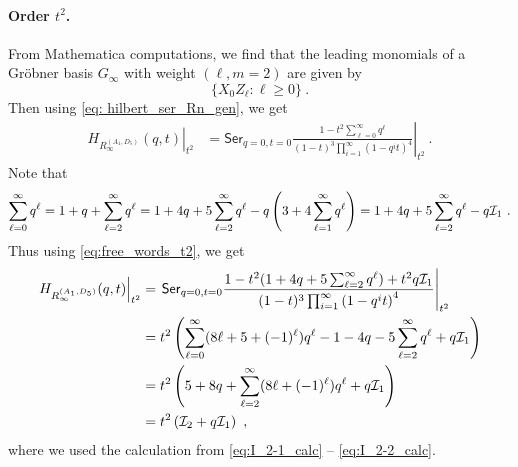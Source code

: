 \documentclass[a4paper,10pt]{article}
\newcommand{\mr}[1]{\mathsf{#1}}
\def\CI {{\cal I}}
\def\CI {{{\cal I}}}
\begin{document}
\paragraph{Order $t^2$.} From Mathematica computations, we find that the leading monomials of a Gr\"{o}bner basis $G_\infty$ with weight  $(\ell,m=2)$ are given by 
\begin{equation}\label{eq:Grob_D5t2}
\{X_0 Z_\ell:\ell\geq 0\}~.    
\end{equation}
Then using \eqref{eq: hilbert_ser_Rn_gen}, we get 
\begin{equation}
\begin{aligned}
\left.H_{R^{(A_1, D_5)}_{\infty}}(q, t)\right|_{t^2}&=\left.\mr{Ser}_{q=0, t=0} \frac{1-t^2 \sum_{\ell=0}^{\infty}q^\ell}{(1-t)^3 \prod_{i=1}^{\infty}\left(1-q^i t\right)^4}\right|_{t^2}~.
\end{aligned}
\end{equation}
Note that 
\begin{equation}
\sum_{\ell=0}^{\infty}q^\ell=1+q+\sum_{\ell=2}^\infty q^\ell=1+4q+5\sum_{\ell=2}^{\infty}q^\ell-q\left(3+4\sum_{\ell=1}^{\infty}q^\ell\right)=1+4q+5\sum_{\ell=2}^{\infty}q^\ell-q\CI_1~.    
\end{equation}
Thus using \eqref{eq:free_words_t2}, we get 
\begin{equation}
\begin{split}
\left.H_{R^{(A_1, D_5)}_{\infty}}(q, t)\right|_{t^2}&=\left. \mr{Ser}_{q=0, t=0} \frac{1-t^2 (1+ 4 q + 5\sum_{\ell=2}^{\infty}q^\ell)+t^2q\mathcal{I}_1}{(1-t)^3 \prod_{i=1}^{\infty}\left(1-q^i t\right)^4}\right|_{t^2}
\\
&=t^2\left(\sum_{\ell=0}^\infty (8\ell+5+(-1)^\ell)q^\ell-1- 4 q - 5\sum_{\ell=2}^{\infty}q^\ell+q\CI_1\right)
\\
&=t^2\left(5+8q+\sum_{\ell=2}^\infty (8\ell+(-1)^\ell)q^\ell+q\CI_1\right)
\\
& = t^2\left(\mathcal{I}_2+q\mathcal{I}_1\right)~,
\end{split}    
\end{equation}
where we used the calculation from \eqref{eq:I_2-1_calc} -- \eqref{eq:I_2-2_calc}.
\end{document}

